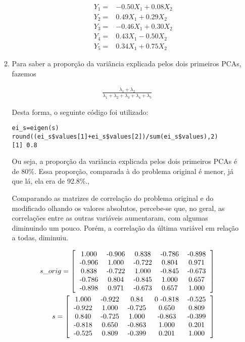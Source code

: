 \documentclass[11pt,a4paper]{book}
\begin{document}
\begin{enumerate}
\begin{enumerate}[label=\alph*)]
\begin{itemize}
					\begin{eqnarray*}
						Y_1=&-0.50X_1+0.08X_2\\
						Y_2=&0.49X_1+0.29X_2\\
						Y_3=&-0.46X_1+0.30X_2\\
						Y_4=&0.43X_1-0.50X_2\\
						Y_5=&0.34X_1+0.75X_2
					\end{eqnarray*}
				\end{itemize}
				\item
				Para saber a proporção da variância explicada pelos dois primeiros PCAs, fazemos
					
				\begin{eqnarray*}
					\frac{\lambda_1+\lambda_2}{\lambda_1+\lambda_2+\lambda_3+\lambda_4+\lambda_5}
				\end{eqnarray*}
				
				Desta forma, o seguinte código foi utilizado:
				
				\begin{lstlisting}
ei_s=eigen(s)
round((ei_s$values[1]+ei_s$values[2])/sum(ei_s$values),2)
[1] 0.8
				\end{lstlisting}
				
				Ou seja, a proporção da variância explicada pelos dois primeiros PCAs é de 80\%.
				Essa proporção, comparada à do problema original é menor, já que lá, ela era de 92.8\%.,
				
				Comparando as matrizes de correlação do problema original e do modificado olhando os valores absolutos, percebe-se que, no geral, as correlações entre as outras variáveis aumentaram, com algumas diminuindo um pouco.
				Porém, a correlação da última variável em relação a todas, diminuiu.
				
				\begin{eqnarray*}
					s\_orig=\left[
					\begin{tabular}{c c c c c}
					1.000 & -0.906 &  0.838 & -0.786 & -0.898\\
					-0.906 &  1.000 & -0.722  & 0.804   &0.971\\
					0.838 & -0.722  & 1.000 & -0.845 & -0.673\\
					-0.786  & 0.804 & -0.845 &  1.000  & 0.657\\
					-0.898  & 0.971 & -0.673  & 0.657  & 1.000
					\end{tabular}
					\right]\\ s=\left[
					\begin{tabular}{c c c c c}
					1.000 &  -0.922 &   0.84 & 0 -0.818 &  -0.525\\
					-0.922  &  1.000 &  -0.725  &  0.650  &  0.809\\
					0.840 &  -0.725  &  1.000 &  -0.863  & -0.399\\
					-0.818  &  0.650 &  -0.863  &  1.000 &  0.201\\
					-0.525  &  0.809 &  -0.399 &   0.201  &  1.000
					\end{tabular}
					\right]
				\end{eqnarray*}	
				

\end{enumerate}
\end{enumerate}
\end{document}
